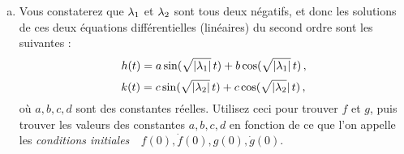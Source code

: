 \begin{prob}
\begin{enumerate}[a)]
  	\item Vous constaterez que $\lambda_1$ et $\lambda_2$ sont tous deux négatifs, et donc les solutions de ces deux équations différentielles (linéaires) du second ordre sont les suivantes : 
	$$h(t)=a \sin( \sqrt{|\lambda_1|}\,t) + b \cos( \sqrt{|\lambda_1|}\,t)\,,$$ 
	$$k(t)=c \sin( \sqrt{|\lambda_2|}\,t) + c \cos( \sqrt{|\lambda_2}|\,t)\,,$$ 
	o\`u $a,b,c,d$ sont des constantes réelles.
  Utilisez ceci pour trouver $f$ et $g$, puis trouver les valeurs des constantes $a,b,c, d$ en fonction de ce que l'on appelle les {\it \og conditions initiales\ \fg\ $f(0), \dot f(0), g(0), \dot g(0)$}.

\end{enumerate}
 


\end{prob}

